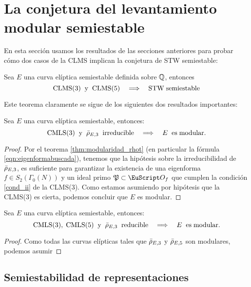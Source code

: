 \documentclass[../../tesis_maestria]{subfiles}
\begin{document}
\section{La conjetura del levantamiento modular semiestable}

En esta secci\'on usamos los resultados de las secciones anteriores para probar 
c\'omo dos casos de la CLMS implican la conjetura de STW semiestable:

\begin{thm}
  Sea $E$ una curva el\'iptica semiestable definida sobre $\mathbb{Q}$, entonces
  \[
    \mathrm{CLMS}(3) \;\; \mathrm{y}\;\; \mathrm{CLMS}(5)
    \quad\Longrightarrow\quad \mathrm{STW}\;\mathrm{semiestable}
  \]
\end{thm}

Este teorema claramente se sigue de los siguientes dos resultados importantes:

\begin{prop}
  Sea $E$ una curva el\'iptica semiestable, entonces:
  \[
    \mathrm{CMLS}(3)\;\;\mathrm{y}\;\; \bar{\rho}_{E,3}\;\;\mathrm{irreducible}\quad\Longrightarrow\quad
    E \;\;\mathrm{es}\;\mathrm{modular.}
  \]
\end{prop}

\begin{proof}
  Por el teorema \ref{thm:modularidad_rhot} (en particular la f\'ormula \ref{eqn:eigenformabuscada}),
  tenemos que la hip\'otesis sobre la irreducibilidad de $\bar{\rho}_{E,3}$, es suficiente para garantizar
  la existencia de una eigenforma $f\in S_2(\Gamma_0(N))$ y un ideal primo $\fP\subset\Oo_f$ que
  cumplen la condici\'on \ref{cond_ii} de la CLMS(3). Como estamos asumiendo por hip\'otesis que
  la CLMS(3) es cierta, podemos concluir que $E$ es modular.
\end{proof}

\begin{prop}
  Sea $E$ una curva el\'iptica semiestable, entonces:
  \[
    \mathrm{CMLS}(3),\;\mathrm{CMLS}(5) \;\;\mathrm{y}\;\; \bar{\rho}_{E,3}\;\;\mathrm{reducible}\quad\Longrightarrow\quad
    E \;\;\mathrm{es}\;\mathrm{modular.}
  \]
\end{prop}

\begin{proof}
  Como todas las curvas el\'ipticas tales que $\bar{\rho}_{E,3}$ y $\bar{\rho}_{E,5}$ son modulares, podemos asumir 
\end{proof}

\subsection{Semiestabilidad de representaciones}%
\end{document}

